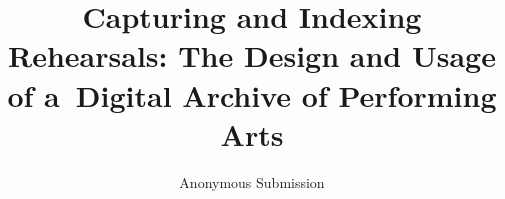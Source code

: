 \documentclass[conference]{IEEEtran}
\begin{document}
%
\title{Capturing and Indexing Rehearsals: The Design and Usage of a~Digital Archive of Performing Arts}


% 
\author{Anonymous Submission}





\maketitle
\end{document}
